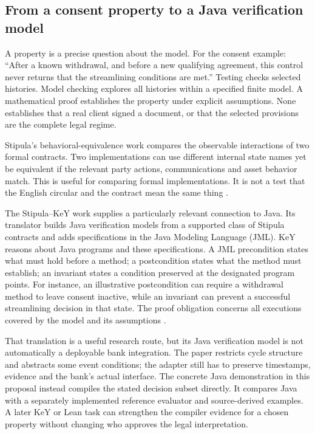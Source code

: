 \documentclass[12pt,a4paper,oneside,openany]{book}
\begin{document}
\subsection{From a consent property to a Java verification model}
\label{merge:P-01a-language-lesson:04}


A property is a precise question about the model. For the consent example:
``After a known withdrawal, and before a new qualifying agreement, this control
never returns that the streamlining conditions are met.'' Testing checks selected
histories. Model checking explores all histories within a specified finite
model. A mathematical proof establishes the property under explicit assumptions.
None establishes that a real client signed a document, or that the selected
provisions are the complete legal regime.

Stipula's behavioral-equivalence work compares the observable interactions of
two formal contracts. Two implementations can use different internal state names
yet be equivalent if the relevant party actions, communications and asset
behavior match. This is useful for comparing formal implementations. It is not
a test that the English circular and the contract mean the same thing
\citep[sec.~5]{stipula2021}.

The Stipula--KeY work supplies a particularly relevant connection to Java.
Its translator builds Java verification models from a supported class of
Stipula contracts and adds specifications in the Java Modeling Language (JML).
KeY reasons about Java programs and these specifications. A JML precondition
states what must hold before a method; a postcondition states what the method
must establish; an invariant states a condition preserved at the designated
program points. For instance, an illustrative postcondition can require a
withdrawal method to leave consent inactive, while an invariant can prevent a
successful streamlining decision in that state. The proof obligation concerns
all executions covered by the model and its assumptions
\citep[secs.~3--5]{stipulakey2025,stipulakeycode}.

That translation is a useful research route, but its Java verification model is
not automatically a deployable bank integration. The paper restricts cycle
structure and abstracts some event conditions; the adapter still has to preserve
timestamps, evidence and the bank's actual interface. The concrete Java
demonstration in this proposal instead compiles the stated decision subset
directly. It compares Java with a separately implemented reference evaluator
and source-derived examples. A later KeY or Lean task can strengthen the
compiler evidence for a chosen property without changing who approves the
legal interpretation.
\end{document}

